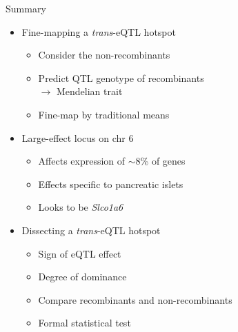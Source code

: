\documentclass[aspectratio=169,12pt,t]{beamer}
\begin{document}
\begin{frame}[c]{Summary}
  \begin{itemize}
  \itemsep12pt
  \item Fine-mapping a \emph{trans}-eQTL hotspot
    \begin{itemize}
    \item Consider the non-recombinants
    \item Predict QTL genotype of recombinants \\
          $\longrightarrow$ Mendelian trait
    \item Fine-map by traditional means
    \end{itemize}
  \item Large-effect locus on chr 6
    \begin{itemize}
    \item Affects expression of $\sim$8\% of genes
    \item Effects specific to pancreatic islets
    \item Looks to be \emph{Slco1a6}
    \end{itemize}
  \item Dissecting a \emph{trans}-eQTL hotspot
    \begin{itemize}
    \item Sign of eQTL effect
    \item Degree of dominance
    \item Compare recombinants and non-recombinants
    \item Formal statistical test
    \end{itemize}
  \end{itemize}


\end{frame}
\end{document}
